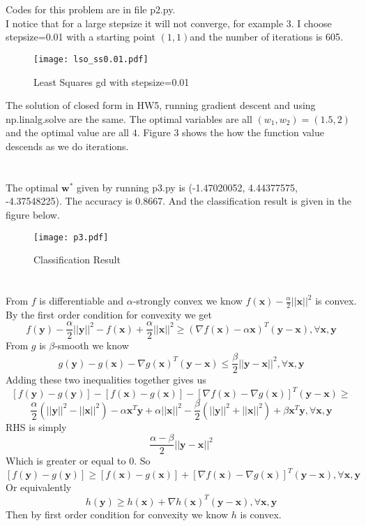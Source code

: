 \documentclass[12pt,letterpaper]{article}
\begin{document}
\section{}
Codes for this problem are in file p2.py. \\
I notice that for a large stepsize it will not converge, for example 3. I choose stepsize=0.01 with a starting point $(1,1)$and the number of iterations is 605. \\
\begin{figure}[H]
\centering
\texttt{[image: lso\_ss0.01.pdf]}
\caption{Least Squares gd with stepsize=0.01 }
\label{lso}
\end{figure}
The solution of closed form in HW5, running gradient descent and using np.linalg.solve are the same. The optimal variables are all $(w_1,w_2)=(1.5,2)$ and the optimal value are all $4$. Figure 3 shows the how the function value descends as we do iterations.
\section{}
The optimal $\boldsymbol{w}^*$ given by running p3.py is (-1.47020052, 4.44377575, -4.37548225). The accuracy is 0.8667. And the classification result is given in the figure below.
\begin{figure}[H]
\centering
\texttt{[image: p3.pdf]}
\caption{Classification Result }
\label{logistic}
\end{figure}
\section{}
From $f$ is differentiable and $\alpha$-strongly convex we know $f(\boldsymbol{x})-\frac{\alpha}{2}||\boldsymbol{x}||^2$ is convex. By the first order condition for convexity we get $$f(\boldsymbol{y})-\frac{\alpha}{2}||\boldsymbol{y}||^2-f(\boldsymbol{x})+\frac{\alpha}{2}||\boldsymbol{x}||^2\geq(\nabla f(\boldsymbol{x})-\alpha\boldsymbol{x})^T(\boldsymbol{y}-\boldsymbol{x}), \forall \boldsymbol{x},\boldsymbol{y}$$ From $g$ is $\beta$-smooth we know $$g(\boldsymbol{y})-g(\boldsymbol{x})-\nabla g(\boldsymbol{x})^T(\boldsymbol{y}-\boldsymbol{x})\leq \frac{\beta}{2}||\boldsymbol{y}-\boldsymbol{x}||^2,\forall \boldsymbol{x},\boldsymbol{y}$$ Adding these two inequalities together gives us 
$$[f(\boldsymbol{y})-g(\boldsymbol{y})]-[f(\boldsymbol{x})-g(\boldsymbol{x})]-[\nabla f(\boldsymbol{x})-\nabla g(\boldsymbol{x})]^T(\boldsymbol{y}-\boldsymbol{x})\geq$$ $$\frac{\alpha}{2}(||\boldsymbol{y}||^2-||\boldsymbol{x}||^2)-\alpha\boldsymbol{x}^T\boldsymbol{y}+\alpha||\boldsymbol{x}||^2-\frac{\beta}{2}(||\boldsymbol{y}||^2+||\boldsymbol{x}||^2)+\beta\boldsymbol{x}^T\boldsymbol{y},\forall \boldsymbol{x},\boldsymbol{y}$$
RHS is simply $$\frac{\alpha-\beta}{2}||\boldsymbol{y}-
\boldsymbol{x}||^2$$
Which is greater or equal to $0$. So$$[f(\boldsymbol{y})-g(\boldsymbol{y})]\geq[f(\boldsymbol{x})-g(\boldsymbol{x})]+[\nabla f(\boldsymbol{x})-\nabla g(\boldsymbol{x})]^T(\boldsymbol{y}-\boldsymbol{x}),\forall \boldsymbol{x},\boldsymbol{y}$$
Or equivalently$$h(\boldsymbol{y})\geq h(\boldsymbol{x})+\nabla h(\boldsymbol{x})^T(\boldsymbol{y}-\boldsymbol{x}),\forall\boldsymbol{x},\boldsymbol{y}$$
Then by first order condition for convexity we know $h$ is convex.
\end{document}
